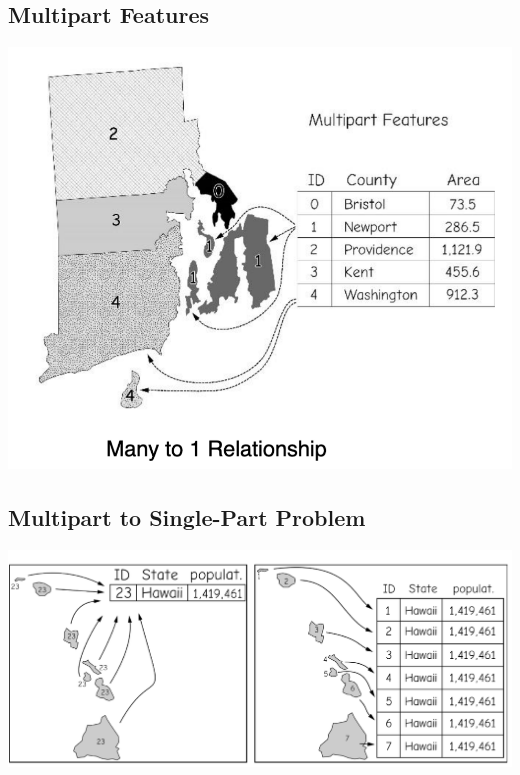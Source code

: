 \documentclass[11pt]{article}
\theoremstyle{definition}
\begin{document}
\subsection{Multipart Features}
\includegraphics[width=\textwidth/3]{24.png}

\subsection{Multipart to Single-Part Problem}
\includegraphics[width=\textwidth/3]{25.png}
\end{document}
